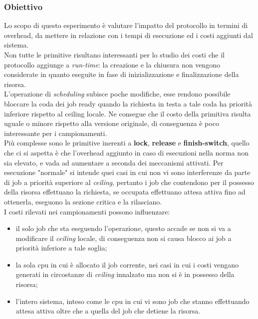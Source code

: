 \subsubsection{Obiettivo}
\label{sec:overhead_ob}

\noindent Lo scopo di questo esperimento è valutare l'impatto del protocollo in termini di overhead, da mettere in relazione con i tempi di esecuzione ed i costi aggiunti dal sistema.\\

\noindent Non tutte le primitive risultano interessanti per lo studio dei costi che il protocollo aggiunge a \textit{run-time}: la creazione e la chiusura non vengono considerate in quanto eseguite in fase di inizializzazione e finalizzazione della risorsa.\\

\noindent L'operazione di \textit{scheduling} subisce poche modifiche, esse rendono possibile bloccare la coda dei job ready quando la richiesta in testa a tale coda ha priorità inferiore rispetto al ceiling locale. Ne consegue che il costo della primitiva risulta uguale o minore rispetto alla versione originale, di conseguenza è poco interessante per i campionamenti.\\

\noindent Più complesse sono le primitive inerenti a \textbf{lock}, \textbf{release} e \textbf{finish-switch}, quello che ci si aspetta è che l'overhead aggiunto in caso di esecuzioni nella norma non sia elevato, e vada ad aumentare a seconda dei meccanismi attivati. Per esecuzione "normale" si intende quei casi in cui non vi sono interferenze da parte di job a priorità superiore al \textit{ceiling}, pertanto i job che contendono per il possesso della risorsa effettuano la richiesta, se occupata effettuano attesa attiva fino ad ottenerla, eseguono la sezione critica e la rilasciano.\\

\noindent I costi rilevati nei campionamenti possono influenzare:\\

\begin{itemize}
	\item il solo job che sta eseguendo l'operazione, questo accade se non si va a modificare il \textit{ceiling} locale, di conseguenza non si causa blocco ai job a priorità inferiore a tale soglia;
	\item la sola cpu in cui è allocato il job corrente, nei casi in cui i costi vengano generati in circostanze di \textit{ceiling} innalzato ma non si è in possesso della risorsa;
	\item l'intero sistema, inteso come le cpu in cui vi sono job che stanno effettuando attesa attiva oltre che a quella del job che detiene la risorsa.
\end{itemize}

